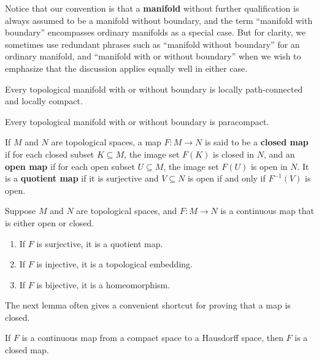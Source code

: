 Notice that our convention is that a \textbf{manifold} without further qualification is always assumed to be a manifold without boundary, and the term ``manifold with boundary'' encompasses ordinary manifolds as a special case. But for clarity, we sometimes use redundant phrases such as ``manifold without boundary'' for an ordinary manifold, and ``manifold with or without boundary'' when we wish to emphasize that the discussion applies equally well in either case.

\begin{proposition}
\label{prop:topological-manifolds-locally-path-connected-compact}
Every topological manifold with or without boundary is locally path-connected and locally compact.
\end{proposition}

\begin{proposition}
\label{prop:topological-manifolds-paracompact}
Every topological manifold with or without boundary is paracompact.
\end{proposition}

If $M$ and $N$ are topological spaces, a map $F : M \to N$ is said to be a \textbf{closed map} if for each closed subset $K \subseteq M$, the image set $F(K)$ is closed in $N$, and an \textbf{open map} if for each open subset $U \subseteq M$, the image set $F(U)$ is open in $N$. It is a \textbf{quotient map} if it is surjective and $V \subseteq N$ is open if and only if $F^{-1}(V)$ is open.

\begin{proposition}
\label{prop:continuous-open-closed-maps}
Suppose $M$ and $N$ are topological spaces, and $F : M \to N$ is a continuous map that is either open or closed.
\begin{enumerate}
\item[(a)] If $F$ is surjective, it is a quotient map.
\item[(b)] If $F$ is injective, it is a topological embedding.
\item[(c)] If $F$ is bijective, it is a homeomorphism.
\end{enumerate}
\end{proposition}

The next lemma often gives a convenient shortcut for proving that a map is closed.

\begin{lemma}
\label{lem:closed-map-lemma}
If $F$ is a continuous map from a compact space to a Hausdorff space, then $F$ is a closed map.
\end{lemma}

